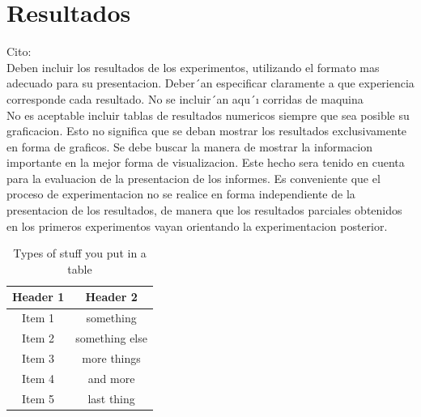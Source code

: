 \documentclass[double,12pt]{beavtex}
\begin{document}
{{\begin{itemize}
\end{itemize}
}



\chapter{Resultados}

Cito: \\

Deben incluir los resultados de los experimentos, utilizando el formato mas adecuado
para su presentacion. Deber´an especificar claramente a que experiencia corresponde
cada resultado. No se incluir´an aqu´ı corridas de maquina\\
No es aceptable incluir tablas de resultados numericos siempre que sea posible su
graficacion. 
Esto no significa que se deban mostrar los resultados exclusivamente en forma de graficos.
Se debe buscar la manera de mostrar la informacion importante en la mejor forma de visualizacion. Este hecho sera tenido en cuenta para la evaluacion de la presentacion de los informes.
Es conveniente que el proceso de experimentacion no se realice en forma independiente
de la presentacion de los resultados, de manera que los resultados parciales obtenidos en
los primeros experimentos vayan orientando la experimentacion posterior.




\begin{table}[ht]
\caption{Types of stuff you put in a table} %
\centering  %
\begin{tabular}{c c} %
\hline\hline                        %
Header 1 & Header 2 \\ [0.5ex] %
\hline                  %
Item 1 & something  \\ %
Item 2 & something else  \\
Item 3 & more things  \\
Item 4 & and more \\
Item 5 & last thing \\ [1ex]      %
\hline %
\end{tabular}
\label{table:misc} %
\end{table}





}
\end{document}

